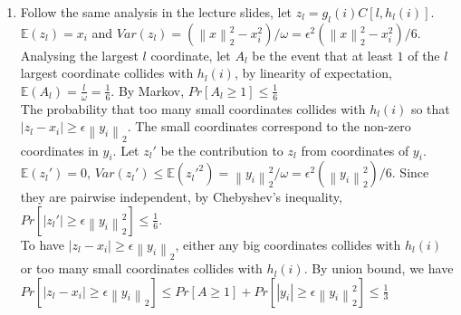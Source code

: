 \documentclass[11pt]{article}%
\newcommand{\norm}[1]{\left\lVert#1\right\rVert}
\begin{document}
\begin{questions}[1]
\begin{enumerate}
\begin{enumerate}
        Let $f_j = f_i + f_i'$, the true frequency in $\sigma_1 \cdot \sigma_2$\\
        
        Let $\hat{f_j}$ be the estimate frequency of $\sigma_1 \cdot \sigma_2$, $\hat{f_j} = \hat{f_i} + \hat{f_i'} - c$. (let c be the $k+1$ counter size)\\
        
        Let $m_j$ be the total number of item in $\sigma_1 \cdot \sigma_2$ and $\hat{m_j}$ be the estimate, $m_j = m + m_1$, $m_j' \geq m' + m_1' - c \cdot (k + 1)$ (We ignore the non-positive part, we minus $c$ to at least $k+1$ counters)\\
        
        $(f_j - \hat{f_j}) \leq f_i + f_i' - (\hat{f_i} + \hat{f_i'}) + c \leq c + \frac{m - m'}{k+1} + \frac{m_1 - m_1'}{k+1} = c + \frac{m - m' + m_1 - m_1'}{k + 1} \leq c + \frac{m_j - m_j' - c \cdot (k+1)}{k+1} = \frac{m_j - m_j'}{k + 1} \implies f_j - \frac{m_j - m_j'}{k + 1} \leq \hat{f_j}\leq f_j$\\
    \end{enumerate}
    \newpage
    \item Follow the same analysis in the lecture slides, let $z_l = g_l(i)C[l,h_l(i)]$. $\mathbb{E}(z_l) = x_i$ and $Var(z_l) =  (\norm{x}^2_2 - x_i^2)/ \omega = \epsilon^2(\norm{x}^2_2 - x_i^2)/6$.\\

    Analysing the largest $l$ coordinate, let $A_l$ be the event that at least $1$ of the $l$ largest coordinate collides with $h_l(i)$, by linearity of expectation, $\mathbb{E}(A_l) = \frac{l}{\omega} = \frac{1}{6}$. By Markov, $Pr[A_l \geq 1] \leq \frac{1}{6}$\\
    
    The probability that too many small coordinates collides with $h_l(i)$ so that $|z_l - x_i| \geq \epsilon\norm{y_i}_2$. The small coordinates correspond to the non-zero coordinates in $y_i$. Let $z_l'$ be the contribution to $z_l$ from coordinates of $y_i$. $\mathbb{E}(z_l') = 0$, $Var(z_l') \leq \mathbb{E}(z_l'^2) = \norm{y_i}^2_2/\omega = \epsilon^2(\norm{y_i}^2_2)/6$. Since they are pairwise independent, by Chebyshev's inequality, $Pr[|z_l'| \geq \epsilon\norm{y_i}^2_2] \leq \frac{1}{6}. $ \\
    
    To have $|z_l - x_i| \geq \epsilon\norm{y_i}_2$, either any big coordinates collides with $h_l(i)$ or too many small coordinates collides with $h_l(i)$. By union bound, we have $Pr[|z_l - x_i| \geq \epsilon\norm{y_i}_2] \leq Pr[A \geq 1] + Pr[|y_i| \geq \epsilon\norm{y_i}^2_2] \leq \frac{1}{3}$\\
    

\end{enumerate}
\end{questions}
\end{document}
